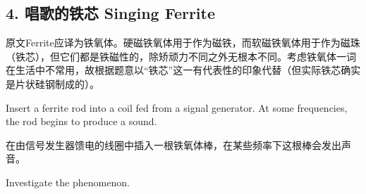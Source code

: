 \documentclass[a4paper,10pt,english]{sphinxmanual}
\begin{document}
\subsection{4. 唱歌的铁芯 \sphinxfootnotemark[3] Singing Ferrite}
\label{\detokenize{7. Appendix:singing-ferrite}}%
\begin{footnotetext}[3]\sphinxAtStartFootnote
原文Ferrite应译为铁氧体。硬磁铁氧体用于作为磁铁，而软磁铁氧体用于作为磁珠（铁芯），但它们都是铁磁性的，除矫顽力不同之外无根本不同。考虑铁氧体一词在生活中不常用，故根据题意以“铁芯”这一有代表性的印象代替（但实际铁芯确实是片状硅钢制成的）。
%
\end{footnotetext}\ignorespaces 
Insert a ferrite rod into a coil fed from a signal generator. At some frequencies, the rod begins to produce a sound.

在由信号发生器馈电的线圈中插入一根铁氧体棒，在某些频率下这根棒会发出声音。

Investigate the phenomenon.
\end{document}
